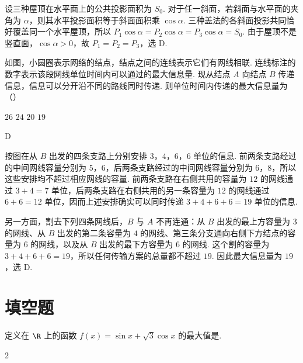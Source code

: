 \begin{solution}
设三种屋顶在水平面上的公共投影面积为 \(S_0\). 对于任一斜面，若斜面与水平面的夹角为 \(\alpha\)，则其水平投影面积等于斜面面积乘 \(\cos\alpha\). 三种盖法的各斜面投影共同恰好覆盖同一个水平屋顶，所以
\(P_1\cos\alpha=P_2\cos\alpha=P_3\cos\alpha=S_0\). 由于屋顶不是竖直面，\(\cos\alpha>0\)，故 \(P_1=P_2=P_3\)，选 D.
\end{solution}

\begin{problem}
如图，小圆圈表示网络的结点，结点之间的连线表示它们有网线相联. 连线标注的数字表示该段网线单位时间内可以通过的最大信息量. 现从结点 \(A\) 向结点 \(B\) 传递信息，信息可以分开沿不同的路线同时传递. 则单位时间内传递的最大信息量为（\quad）


\choices
    {\(26\)}
    {\(24\)}
    {\(20\)}
    {\(19\)}
\end{problem}

\begin{answer}
D
\end{answer}

\begin{solution}
按图在从 \(B\) 出发的四条支路上分别安排 \(3\)，\(4\)，\(6\)，\(6\) 单位的信息. 前两条支路经过的中间网线容量分别为 \(5\)，\(6\)，后两条支路经过的中间网线容量分别为 \(6\)，\(8\)，所以这些安排均不超过相应网线的容量. 前两条支路在右侧共用的容量为 \(12\) 的网线通过 \(3+4=7\) 单位，后两条支路在右侧共用的另一条容量为 \(12\) 的网线通过 \(6+6=12\) 单位，因而上述安排确实可以同时传递 \(3+4+6+6=19\) 单位的信息.

另一方面，割去下列四条网线后，\(B\) 与 \(A\) 不再连通：从 \(B\) 出发的最上方容量为 \(3\) 的网线、从 \(B\) 出发的第二条容量为 \(4\) 的网线、第三条分支通向右侧下方结点的容量为 \(6\) 的网线，以及从 \(B\) 出发的最下方容量为 \(6\) 的网线. 这个割的容量为 \(3+4+6+6=19\)，所以任何传输方案的总量都不超过 \(19\). 因此最大信息量为 \(19\)，选 D.
\end{solution}

\section{填空题}
\begin{problem}
定义在 \(\R\) 上的函数 \(f(x)=\sin x + \sqrt{3}\cos x\) 的最大值是\fillinblank{}.
\end{problem}

\begin{answer}
2
\end{answer}

